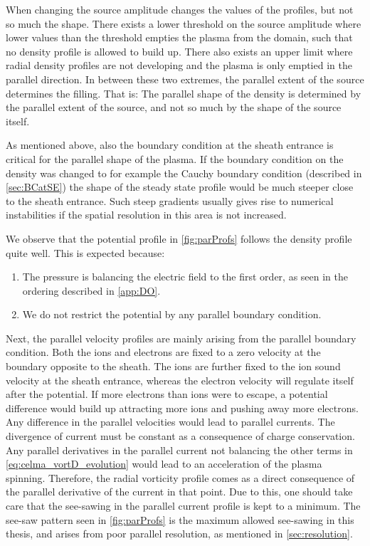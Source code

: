 When changing the source amplitude changes the values of the profiles, but not so much the shape.
There exists a lower threshold on the source amplitude where lower values than the threshold empties the plasma from the domain, such that no density profile is allowed to build up.
There also exists an upper limit where radial density profiles are not developing and the plasma is only emptied in the parallel direction.
In between these two extremes, the parallel extent of the source determines the filling.
That is: The parallel shape of the density is determined by the parallel extent of the source, and not so much by the shape of the source itself.

As mentioned above, also the boundary condition at the sheath entrance is critical for the parallel shape of the plasma.
If the boundary condition on the density was changed to for example the Cauchy boundary condition (described in \cref{sec:BCatSE}) the shape of the steady state profile would be much steeper close to the sheath entrance.
Such steep gradients usually gives rise to numerical instabilities if the spatial resolution in this area is not increased.

We observe that the potential profile in \cref{fig:parProfs} follows the density profile quite well.
This is expected because:
%
\begin{enumerate}[noitemsep]
        \item The pressure is balancing the electric field to the first order, as seen in the ordering described in \ref{app:DO}.
        \item We do not restrict the potential by any parallel boundary condition.
\end{enumerate}

Next, the parallel velocity profiles are mainly arising from the parallel boundary condition.
Both the ions and electrons are fixed to a zero velocity at the boundary opposite to the sheath.
The ions are further fixed to the ion sound velocity at the sheath entrance, whereas the electron velocity will regulate itself after the potential.
If more electrons than ions were to escape, a potential difference would build up attracting more ions and pushing away more electrons.
%
%
Any difference in the parallel velocities would lead to parallel currents.
The divergence of current must be constant as a consequence of charge conservation.
Any parallel derivatives in the parallel current not balancing the other terms in \cref{eq:celma_vortD_evolution} would lead to an acceleration of the plasma spinning.
Therefore, the radial vorticity profile comes as a direct consequence of the parallel derivative of the current in that point.
Due to this, one should take care that the see-sawing in the parallel current profile is kept to a minimum.
The see-saw pattern seen in \cref{fig:parProfs} is the maximum allowed see-sawing in this thesis, and arises from poor parallel resolution, as mentioned in \ref{sec:resolution}.


